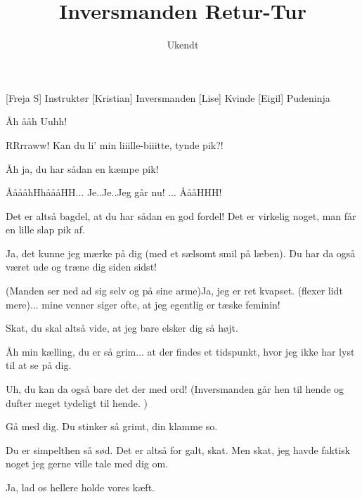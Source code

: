 \documentclass[a4paper,11pt]{article}
\title{Inversmanden Retur-Tur}
\author{Ukendt}
\begin{document}
\maketitle

\begin{roles}
[Freja S] Instruktør
[Kristian] Inversmanden
[Lise] Kvinde
[Eigil] Pudeninja
\end{roles}


\begin{sketch}
 Åh ååh Uuhh!

  RRrraww! Kan du li' min liiille-biiitte, tynde pik?!

 Åh ja, du har sådan en kæmpe pik!

  ÅåååhHhåååHH... Je..Je..Jeg går nu! ... ÅååHHH!


 Det er altså bagdel, at du har sådan en god fordel! Det er virkelig noget, man får en lille slap pik af.

 Ja, det kunne jeg mærke på dig (med et sælsomt smil på læben). Du har da også været ude og træne dig siden sidst!

 (Manden ser ned ad sig selv og på sine arme)Ja, jeg er ret kvapset. (flexer lidt mere)... mine venner siger ofte, at jeg egentlig er tæske feminin!

  Skat, du skal altså vide, at jeg bare elsker dig så højt.

  Åh min kælling, du er så grim... at der findes et tidspunkt, hvor jeg ikke har lyst til at se på dig.

  Uh, du kan da også bare det der med ord! (Inversmanden går hen til hende og dufter meget tydeligt til hende. )

 Gå med dig. Du stinker så grimt, din klamme so.

 Du er simpelthen så sød. Det er altså for galt, skat. Men skat, jeg havde faktisk noget jeg gerne ville tale med dig om.

 Ja, lad os hellere holde vores kæft.


\end{sketch}
\end{document}
